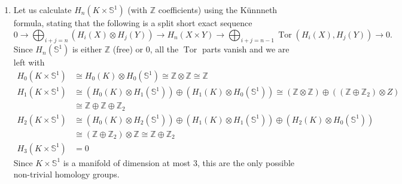 \documentclass[a4paper, 12pt]{article}
\DeclareMathOperator{\Tor}{Tor}
\renewcommand{\S}{\mathbb{S}}
\newcommand{\Z}{\mathbb{Z}}
\newcommand{\iso}{\cong}
\begin{document}
\begin{enumerate}
	\item Let us calculate $H_n(K \times \S^1)$ (with $\Z$ coefficients) using the K\"unnneth formula, stating that the following is a split short exact sequence
	\[
	0 \to \bigoplus_{i+j=n}(H_i(X)\otimes H_j(Y)) \to H_n(X \times Y) \to \bigoplus_{i+j=n-1}\Tor(H_i(X), H_j(Y)) \to 0.
	\]
	Since $H_n(\S^1) $ is either $\Z$ (free) or $0$, all the $\Tor$ parts vanish and we are left with
	\begin{align*}
	H_0(K\times\S^1) &\iso H_0(K) \otimes H_0(\S^1) \iso \Z \otimes \Z \iso \Z \\
	H_1(K\times\S^1) &\iso (H_0(K) \otimes H_1(\S^1)) \oplus (H_1(K) \otimes H_0(\S^1)) \iso (\Z \otimes \Z) \oplus ((\Z \oplus \Z_2)\otimes Z) \\ &\iso \Z\oplus\Z\oplus\Z_2 \\
	H_2(K\times\S^1) &\iso (H_0(K) \otimes H_2(\S^1)) \oplus (H_1(K) \otimes H_1(\S^1)) \oplus (H_2(K) \otimes H_0(\S^1))\\  &\iso (\Z \oplus \Z_2) \otimes \Z \iso \Z \oplus \Z_2 \\
	H_3(K\times\S^1) &= 0
	\end{align*}
	Since $K \times \S^1$ is a manifold of dimension at most $3$, this are the only possible non-trivial homology groups.
	

\end{enumerate}
\end{document}
